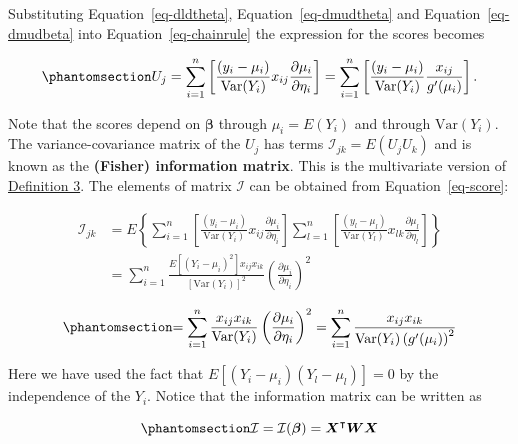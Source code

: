 \documentclass[
  a4paper,
  DIV=11,
  numbers=noendperiod]{scrreprt}
\newcommand{\term}[1]{\textbf{#1}}
\newenvironment{fbxSimple}[3]{\begin{tcolorbox}[enhanced, breakable,%
attach boxed title to top*={xshift=1.4pt},
boxed title style={boxrule=0.0mm, fuzzy shadow={1pt}{-1pt}{0mm}{0.1mm}{gray}, arc=.3em, rounded corners=east, sharp corners=west}, colframe=#1-color2, colbacktitle=#1-color1, colback = white, coltitle=black,  titlerule=0mm, toprule=0pt, bottomrule=.7pt, leftrule=.3em, rightrule=.7pt, outer arc=.3em,  	left=.5em, right=.5em, bottomtitle=1mm, toptitle=1mm,title=\textbf{#2}\hspace{0.5em}{#3}]}
{\end{tcolorbox}}
\begin{document}
\begin{fbxSimple}{Supplement}{Supplement 1}{}
Substituting Equation~\ref{eq-dldtheta}, Equation~\ref{eq-dmudtheta} and
Equation~\ref{eq-dmudbeta} into Equation~\ref{eq-chainrule} the
expression for the scores becomes

\begin{equation}\phantomsection\label{eq-score}{
U_j=\sum_{i=1}^n \left[  \frac{(y_i-\mu_i)}{\mathrm{Var}(Y_i)}x_{ij} \frac{\partial \mu_i}{\partial \eta_i}\right]=\sum_{i=1}^n \left[  \frac{(y_i-\mu_i)}{\mathrm{Var}(Y_i)}\frac{x_{ij}} {g'(\mu_i)}\right].
}\end{equation}

Note that the scores depend on \(\boldsymbol{\beta}\) through
\(\mu_i=E(Y_i)\) and through \(\mathrm{Var}(Y_i)\). The
variance-covariance matrix of the \(U_j\) has terms
\(\mathcal{\mathcal{I}}_{jk}=E(U_jU_k)\) and is known as the
\term{(Fisher) information matrix}. This is the multivariate version of
\hyperref[rdefinfuniv]{Definition 3}. The elements of matrix
\(\mathcal{\mathcal{I}}\) can be obtained from Equation~\ref{eq-score}:

\[
\begin{aligned}
 \mathcal{\mathcal{I}}_{jk}&=  E \left \lbrace \sum_{i=1}^n \left[  \frac{(y_i-\mu_i)}{\mathrm{Var}(Y_i)}x_{ij} \frac{\partial \mu_i}{\partial \eta_i}\right] \sum_{l=1}^n \left[  \frac{(y_l-\mu_l)}{\mathrm{Var}(Y_l)}x_{lk} \frac{\partial \mu_l}{\partial \eta_l}\right]  \right \rbrace \nonumber \\
 &=\sum_{i=1}^n \frac{E[(Y_i-\mu_i)^2]x_{ij}x_{ik}}{[\mathrm{Var}(Y_i)]^2} \left(\frac{\partial \mu_i}{\partial \eta_i} \right)^2  \nonumber\\
\end{aligned}
\] \begin{equation}\phantomsection\label{eq-informationmatrix}{
=\sum_{i=1}^n \frac{x_{ij}x_{ik}}{\mathrm{Var}(Y_i)} \left(\frac{\partial \mu_i}{\partial \eta_i} \right)^2 = \sum_{i=1}^n \frac{x_{ij}x_{ik}}{\mathrm{Var}(Y_i)\left(g'(\mu_i)\right)^2}
}\end{equation}

Here we have used the fact that \(E[(Y_i-\mu_i)(Y_l-\mu_l)]=0\) by the
independence of the \(Y_i\). Notice that the information matrix can be
written as

\begin{equation}\phantomsection\label{eq-informationirwls}{
\mathcal{I}=\mathcal{I}(\boldsymbol{\beta})=\boldsymbol{X}^\intercal \boldsymbol{W} \boldsymbol{X}
}\end{equation}


\end{fbxSimple}
\end{document}
